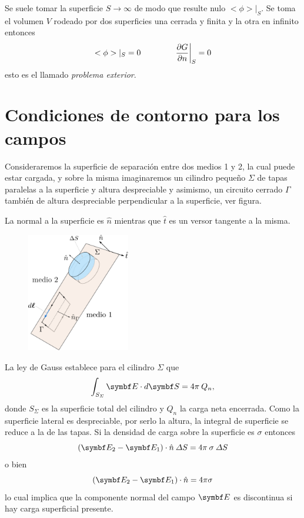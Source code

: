 \documentclass[10pt,oneside]{CBFT_book}
\begin{document}
Se suele tomar la superficie $S \to \infty$ de modo que resulte nulo $<\phi>|_S$.
Se toma el volumen $V$ rodeado por dos superficies una cerrada y finita y la otra
en infinito entonces
\[
	<\phi>|_S = 0 \qquad \qquad \left. \frac{\partial^{\hspace{-0.05em}} {G}}{\partial {n}^{\hspace{-0.05em}}}\right|_S = 0
\]
esto es el llamado {\it problema exterior}.

\section{Condiciones de contorno para los campos}

Consideraremos la superficie de separación entre dos medios 1 y 2, la cual puede estar cargada, y sobre
la misma imaginaremos un cilindro pequeño $\Sigma$ de tapas paralelas a la superficie y altura despreciable y 
asimismo, un circuito cerrado $\Gamma$ también de altura despreciable perpendicular a la superficie, ver figura.

La normal a la superficie es $\hat{n}$ mientras que $\hat{t}$ es un versor tangente a la misma.

\begin{figure}[!htb]
	\begin{center}
	\includegraphics[width=0.4\textwidth]{images/fig_ft1_contornos_E.pdf} 
	\end{center}
	\caption{}
\end{figure} 

La ley de Gauss establece para el cilindro $\Sigma$ que 
\[
	\int_{S_\Sigma} \vb{E} \cdot d\vb{S} = 4 \pi \: Q_n,
\]
donde $ {S_\Sigma}$ es la superficie total del cilindro y $Q_n$ la carga neta encerrada.
Como la superficie lateral es despreciable, por serlo la altura, la integral de superficie se reduce a la
de las tapas. Si la densidad de carga sobre la superficie es $\sigma$ entonces
\[
	( \vb{E}_2 - \vb{E}_1 )\cdot \hat{n} \: \Delta S = 4 \pi \: \sigma \: \Delta S 
\]
o bien
\[
	( \vb{E}_2 - \vb{E}_1 )\cdot \hat{n} = 4 \pi \sigma 
\]
lo cual implica que la componente normal del campo $\vb{E}$ es discontinua si hay carga superficial presente.
\end{document}
